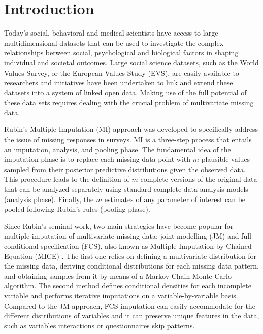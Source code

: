 \section{Introduction}


Today’s social, behavioral and medical scientists have access to large multidimensional datasets that can be
used to investigate the complex relationships between social, psychological and biological factors in 
shaping individual and societal outcomes.
Large social science datasets, such as the World Values Survey, or the European Values Study (EVS), 
are easily available to researchers and initiatives have been undertaken to link and extend these datasets 
into a system of linked open data.
Making use of the full potential of these data sets requires dealing with the crucial problem of multivariate
missing data.

Rubin's Multiple Imputation (MI) approach \citep{rubin:1987} was developed to specifically address the issue of missing 
responses in surveys.
MI is a three-step process that entails an imputation, analysis, and pooling phase.
The fundamental idea of the imputation phase is to replace each missing data point with $m$ plausible values sampled from 
their posterior predictive distributions given the observed data.
This procedure leads to the definition of $m$ complete versions of the original data that can be analyzed separately 
using standard complete-data analysis models (analysis phase).
Finally, the $m$ estimates of any parameter of interest can be pooled following Rubin's rules \citep{rubin:1987} 
(pooling phase).

Since Rubin's seminal work, two main strategies have become popular for multiple imputation of multivariate 
missing data: joint modelling (JM) \citep[ch. 4]{schafer:1997} and full conditional specification (FCS), also known 
as Multiple Imputation by Chained Equation (MICE) \citep{vanBuurenEtAl:2006}.
The first one relies on defining a multivariate distribution for the missing data, deriving conditional
distributions for each missing data pattern, and obtaining samples from it by means of a Markov Chain Monte Carlo 
algorithm.
The second method defines conditional densities for each incomplete variable and performs iterative imputations on 
a variable-by-variable basis.
Compared to the JM approach, FCS imputation can easily accommodate for the different distributions of variables and it 
can preserve unique features in the data, such as variables interactions or questionnaires skip patterns.

